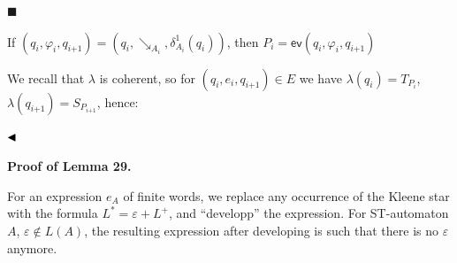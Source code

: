 
 
\par\noindent  $\blacksquare$ 
 
If $(q_{i},\varphi_{i},q_{i\text{+}1})=(q_{i},\mathrel{\searrow_{A_{i}}},\delta_{A_{i}}^{1}(q_{i}))$, then $P_{i}=\mathsf{ev}(q_{i},\varphi_{i},q_{i\text{+}1})$\par
 
 
  
We recall that $\lambda$ is coherent, so for $(q_{i},e_{i},q_{i\text{+}1})\in E$ we have $\lambda(q_{i})=T_{P_{i}}$, $\lambda(q_{i\text{+}1})=S_{P_{i\text{+}1}}$, hence:\par
 
 
 
\begin{center}\end{center}
 
$\hfill\blacktriangleleft$\par
 
 
 
 
\par\medskip\noindent\textbf{Proof of Lemma 29.}\par
 
 
For an expression $e_{A}$ of finite words, we replace any occurrence of the Kleene star with the formula $L^{*}=\varepsilon+L^{+}$, and “developp” the expression. For ST-automaton $A$, $\varepsilon\not\in L(A)$, the resulting expression after developing is such that there is no $\varepsilon$ anymore.\par
 
 
